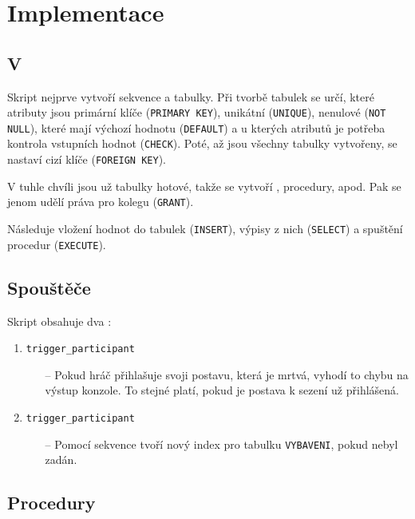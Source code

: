 \documentclass[a4paper, 11pt]{article}
\begin{document}
\section{Implementace}

\subsection*{V }

Skript nejprve vytvoří sekvence a tabulky. Při tvorbě tabulek se určí, které atributy jsou primární klíče (\texttt{PRIMARY KEY}), unikátní (\texttt{UNIQUE}), nenulové (\texttt{NOT NULL}), které mají výchozí hodnotu (\texttt{DEFAULT}) a u kterých atributů je potřeba kontrola vstupních hodnot (\texttt{CHECK}). Poté, až jsou všechny tabulky vytvořeny, se nastaví cizí klíče (\texttt{FOREIGN KEY}).

V tuhle chvíli jsou už tabulky hotové, takže se vytvoří , procedury, apod. Pak se jenom udělí práva pro kolegu (\texttt{GRANT}).

Následuje vložení hodnot do tabulek (\texttt{INSERT}), výpisy z nich (\texttt{SELECT}) a spuštění procedur (\texttt{EXECUTE}).

\subsection{Spouštěče}

Skript obsahuje dva :

\begin{enumerate}
	\item \texttt{trigger\_participant}
		\begin{itemize}
			\item[--] Pokud hráč přihlašuje svoji postavu, která je mrtvá, vyhodí to chybu na výstup konzole. To stejné platí, pokud je postava k sezení už přihlášená.
		\end{itemize}
	\item \texttt{trigger\_participant}
		\begin{itemize}
			\item[--] Pomocí sekvence tvoří nový index pro tabulku \texttt{VYBAVENI}, pokud nebyl zadán.
		\end{itemize}
\end{enumerate}

\subsection{Procedury}
\end{document}
